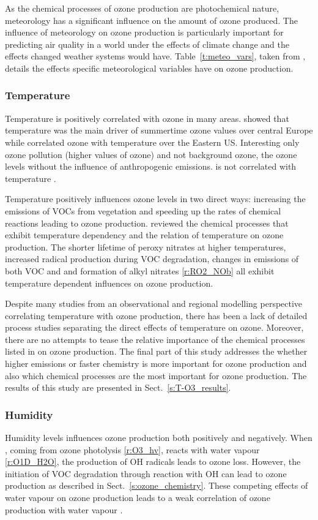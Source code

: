 As the chemical processes of ozone production are photochemical nature, meteorology has a significant influence on the amount of ozone produced.
The influence of meteorology on ozone production is particularly important for predicting air quality in a world under the effects of climate change and the effects changed weather systems would have.
Table~\ref{t:meteo_vars}, taken from \citet{Jacob:2009}, details the effects specific meteorological variables have on ozone production.

\subsubsection{Temperature}
Temperature is positively correlated with ozone in many areas.
\citet{Otero:2016} showed that temperature was the main driver of summertime ozone values over central Europe while \citet{Camalier:2007} correlated ozone with temperature over the Eastern US.
Interesting only ozone pollution (higher values of ozone) and not background ozone, the ozone levels without the influence of anthropogenic emissions. is not correlated with temperature \citep{Sillman:1995a}.

Temperature positively influences ozone levels in two direct ways: increasing the emissions of VOCs from vegetation and speeding up the rates of chemical reactions leading to ozone production.
\citet{Pusede:2015} reviewed the chemical processes that exhibit temperature dependency and the relation of temperature on ozone production.
The shorter lifetime of peroxy nitrates at higher temperatures, increased radical production during VOC degradation, changes in emissions of both VOC and  and formation of alkyl nitrates \eqref{r:RO2_NOb} all exhibit temperature dependent influences on ozone production.

Despite many studies from an observational and regional modelling perspective correlating temperature with ozone production, there has been a lack of detailed process studies separating the direct effects of temperature on ozone.
Moreover, there are no attempts to tease the relative importance of the chemical processes listed in \citet{Pusede:2015} on ozone production.
The final part of this study addresses the whether higher emissions or faster chemistry is more important for ozone production and also which chemical processes are the most important for ozone production.
The results of this study are presented in Sect.~\ref{s:T-O3_results}.

\subsubsection{Humidity}
Humidity levels influences ozone production both positively and negatively.
When , coming from ozone photolysis \eqref{r:O3_hv}, reacts with water vapour \eqref{r:O1D_H2O}, the production of OH radicals leads to ozone loss.
However, the initiation of VOC degradation through reaction with OH can lead to ozone production as described in Sect.~\ref{s:ozone_chemistry}.
These competing effects of water vapour on ozone production leads to a weak correlation of ozone production with water vapour \citep{Jacob:2009}.

